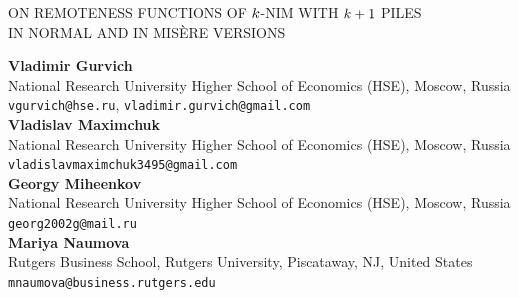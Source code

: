 \documentclass[10pt]{article}
\theoremstyle{definition}
\begin{document}

\begin{center}
\uppercase{
On remoteness functions of 
\; $\MakeLowercase{k}$-NIM with $\MakeLowercase{k}+1$ Piles \\
in Normal and in Mis\`ere Versions}

\vskip 20pt
{\bf Vladimir Gurvich}\\
{\smallit National Research University Higher School of Economics (HSE), Moscow, Russia}\\
{\tt vgurvich@hse.ru}, {\tt vladimir.gurvich@gmail.com}\\
\vskip 10pt
{\bf Vladislav Maximchuk}\\
{\smallit National Research University Higher School of Economics (HSE), Moscow, Russia}\\
{\tt vladislavmaximchuk3495@gmail.com}\\
\vskip 10pt
{\bf Georgy Miheenkov}\\
{\smallit National Research University Higher School of Economics (HSE), Moscow, Russia}\\
{\tt georg2002g@mail.ru}\\
\vskip 10pt
{\bf Mariya Naumova}\\
{\smallit Rutgers Business School, Rutgers University, Piscataway, NJ, United States}\\
{\tt mnaumova@business.rutgers.edu}\\

\end{center}
\end{document}
